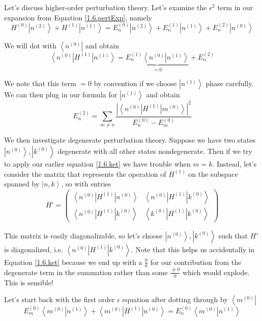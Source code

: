 \documentclass[10pt]{report}
\newcommand{\bra}[1]{\left<#1\right|}
\newcommand{\ket}[1]{\left|#1\right>}
\newcommand{\dotp}[2]{\left<#1\left.\right|#2\right>}
\newcommand{\abs}[1]{\left|#1\right|}
\begin{document}
Let's discuss higher-order perturbation theory. Let's examine the $\epsilon^2$ term in our expansion from Equation \ref{1.6.pertExp}, namely
\begin{equation}
    H^{(0)}\ket{n^{(2)}} + H^{(1)}\ket{n^{(1)}} = E_n^{(0)}\ket{n^{(2)}} + E_n^{(1)}\ket{n^{(1)}} + E^{(2)}_n\ket{n^{(0)}}
    \label{1.8.epsilon2}
\end{equation}

We will dot with $\bra{n^{(0)}}$ and obtain
$$ \bra{n^{(0)}}H^{(1)}\ket{n^{(1)}} =  \underbrace{E_n^{(1)}\dotp{n^{(0)}}{n^{(1)}}}_{=0} + E_n^{(2)}$$

We note that this term $=0$ by convention if we choose $\ket{n^{(1)}}$ phase carefully. We can then plug in our formula for $\ket{n^{(1)}}$ and obtain
\begin{equation}
    E_n^{(2)} = \sum_{m \neq n}\frac{\abs{\bra{n^{(0)}}H^{(1)}\ket{m^{(0)}}}^2}{E_n^{(0)} - E_m^{(0)}}
    \label{1.8.order2pert}
\end{equation}

We then investigate degenerate perturbation theory. Suppose we have two states $\ket{n^{(0)}}, \ket{k^{(0)}}$ degenerate with all other states nondegenerate. Then if we try to apply our earlier equation \ref{1.6.ket} we have trouble when $m=k$. Instead, let's consider the matrix that represents the operation of $H^{(1)}$ on the subspace spanned by $\ket{n,k}$, so with entries
\begin{equation}
    H' = \begin{pmatrix} \bra{n^{(0)}}H^{(1)}\ket{n^{(0)}} & \bra{n^{(0)}}H^{(1)}\ket{k^{(0)}}\\ \bra{n^{(0)}}H^{(1)}\ket{k^{(0)}} & \bra{k^{(0)}}H^{(1)}\ket{k^{(0)}} \end{pmatrix} 
    \label{1.8.subH}
\end{equation}

This matrix is easily diagonalizable, so let's choose $\ket{n^{(0)}}, \ket{k^{(0)}}$ such that $H'$ is diagonalized, i.e. $\bra{n^{(0)}}H^{(1)}\ket{k^{(0)}}$. Note that this helps us accidentally in Equation \ref{1.6.ket} because we end up with a $\frac{0}{0}$ for our contribution from the degenerate term in the summation rather than some $\frac{\neq 0}{0}$ which would explode. This is sensible!

Let's start back with the first order $\epsilon$ equation after dotting through by $\bra{m^{(0)}}$
$$E_m^{(0)}\dotp{m^{(0)}}{n^{(1)}} + \bra{m^{(0)}}H^{(1)}\ket{n^{(0)}} = E_n^{(0)}\dotp{m^{(0)}}{n^{(1)}}$$
\end{document}
